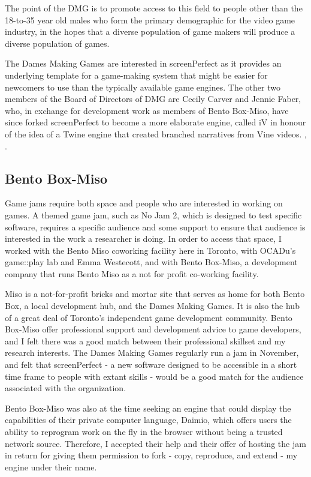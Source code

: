 The point of the DMG is to promote access to this field to people other than the 18-to-35 year old males who form the primary demographic for the video game industry, in the hopes that a diverse population of game makers will produce a diverse population of games. 

The Dames Making Games are interested in screenPerfect as it provides an underlying template for a game-making system that might be easier for newcomers to use than the typically available game engines. The other two members of the Board of Directors of DMG are Cecily Carver and Jennie Faber, who, in exchange for development work as members of Bento Box-Miso, have since forked screenPerfect to become a more elaborate engine, called iV in honour of the idea of a Twine engine that created branched narratives from Vine videos. \parencite{iv}, \parencite{twine}.

\subsection{Bento Box-Miso}
Game jams require both space and people who are interested in working on games. A themed game jam, such as No Jam 2, which is designed to test specific software, requires a specific audience and some support to ensure that audience is interested in the work a researcher is doing. In order to access that space, I worked with the Bento Miso coworking facility here in Toronto, with OCADu's game::play lab and Emma Westecott, and with Bento Box-Miso, a development company that runs Bento Miso as a not for profit co-working facility. 

Miso is a not-for-profit bricks and mortar site that serves as home for both Bento Box, a local development hub, and the Dames Making Games. It is also the hub of a great deal of Toronto's independent game development community. Bento Box-Miso offer professional support and development advice to game developers, and I felt there was a good match between their professional skillset and my research interests. The Dames Making Games regularly run a jam in November, and felt that screenPerfect - a new software designed to be accessible in a short time frame to people with extant skills - would be a good match for the audience associated with the organization.

Bento Box-Miso was also at the time seeking an engine that could display the capabilities of their private computer language, Daimio, which offers users the ability to reprogram work on the fly in the browser without being a trusted network source. Therefore, I accepted their help and their offer of hosting the jam in return for giving them permission to fork - copy, reproduce, and extend - my engine under their name.

